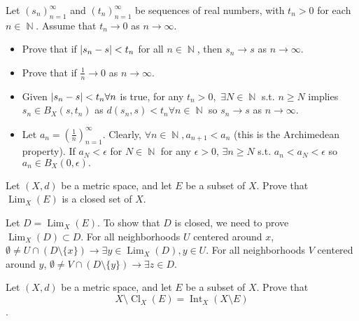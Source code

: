 \documentclass[12pt,letterpaper,boxed]{hmcpset}
\DeclareMathOperator{\Lim}{Lim}
\DeclareMathOperator{\Int}{Int}
\DeclareMathOperator{\Cl}{Cl}
\DeclareMathOperator{\N}{\mathbb{N}}
\DeclarePairedDelimiter\abs{\lvert}{\rvert}%
\begin{document}
\begin{problem}[Exercise 1.15]
Let $(s_n)_{n=1}^{\infty}$ and $(t_n)_{n=1}^{\infty}$ be sequences of real numbers, with $t_n > 0$ for each $n\in\N.$ Assume that $t_n \rightarrow 0$ as $n\rightarrow \infty.$
\vspace{-2mm}
\begin{itemize}
	\itemsep0em
	\item Prove that if $\abs{s_n - s} < t_n$ for all $n \in \N$, then $s_n \rightarrow s$ as $n \rightarrow \infty.$
	\item Prove that if $\frac{1}{n}\rightarrow 0$ as $n\rightarrow \infty.$
\end{itemize}
\end{problem}

\begin{solution}
\vspace{-2mm}
\begin{itemize}
	\itemsep0em
	\item Given $\abs{s_n - s} < t_n \forall n$ is true, for any $t_n > 0,$ $\exists N \in \N$ s.t. $n \ge N$ implies $s_n \in B_X(s, t_n)$ as $d(s_n , s) < t_n \forall n\in\N$ so $s_n\rightarrow s$ as $n \rightarrow \infty.$
	\item Let $a_n = (\frac{1}{n})_{n=1}^{\infty}$. Clearly, $\forall n\in \N, a_{n+1} < a_{n}$ (this is the Archimedean property). If $a_N < \epsilon$ for $N \in \N$ for any $\epsilon > 0$, $\exists n \ge N$ s.t. $a_n < a_N < \epsilon$ so $a_n \in B_X(0, \epsilon).$ 
\end{itemize}
\end{solution}

\begin{problem}[Exercise 1.21]
Let $(X,d)$ be a metric space, and let $E$ be a subset of $X$. Prove that $\Lim_X(E)$ is a closed set of $X$.
\end{problem}

\begin{solution}
Let $D = \Lim_X(E).$ To show that $D$ is closed, we need to prove $\Lim_X(D)\subset D.$ For all neighborhoods $U$ centered around $x$, $\emptyset\neq U \cap (D\setminus \{x\})\rightarrow \exists y \in \Lim_X(D), y \in U.$ For all neighborhoods $V$ centered around $y$, $\emptyset\neq V \cap (D\setminus \{y\})\rightarrow \exists z \in D.$ 
\end{solution}

\begin{problem}[Exercise 1.24]
Let $(X,d)$ be a metric space, and let $E$ be a subset of $X$. Prove that $$X\setminus\Cl_X(E)=\Int_X(X\setminus E)$$. 
\end{problem}

\begin{solution}

\end{solution}
\end{document}
